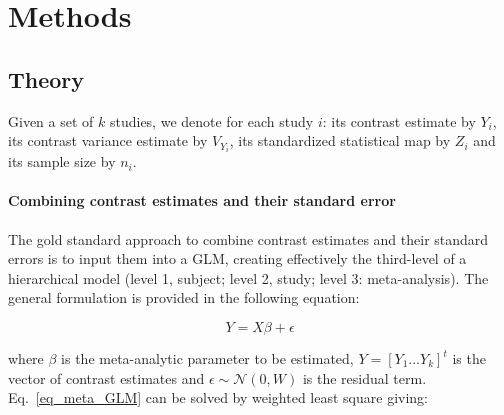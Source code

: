 \documentclass{llncs}
\newcommand{\effectvector}{Y}
\newcommand{\effect}[1][i]{\effectvector_{#1}}
\newcommand{\vareffect}[1][i]{V_{\effect[#1]}}
\newcommand{\zeffect}[1][i]{Z_{#1}}
\newcommand{\nStudies}{k}
\begin{document}



\section{Methods}
\subsection{Theory}
Given a set of $k$ studies, we denote for each study $i$: its contrast estimate by $\effect$, its contrast variance estimate by $\vareffect$, its standardized statistical map by $\zeffect$ and its sample size by $n_i$.		

\paragraph{Combining contrast estimates and their standard error}

The gold standard approach to combine contrast estimates and their standard errors is to input them into a GLM, creating effectively the third-level of a hierarchical model (level 1, subject; level 2, study; level 3: meta-analysis). The general formulation is provided in the following equation:

\begin{equation}
	\effectvector = X \beta + \epsilon
	\label{eq_meta_GLM}
\end{equation}

where $\beta$ is the meta-analytic parameter to be estimated, $Y = [\effect[1] \ldots \effect[\nStudies] ]^t$ is the vector of contrast estimates and $\epsilon \sim \mathcal{N}(0,W)$ is the residual term. Eq.~\eqref{eq_meta_GLM} can be solved by weighted least square giving:
\end{document}
